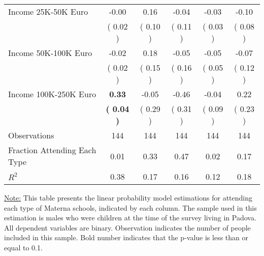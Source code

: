 \begin{table}[H]
{\begin{tabular}{lccccc}
\quad Income 25K-50K Euro &     -0.00 &      0.16 &     -0.04 &     -0.03 &     -0.10 \\
\quad  & (     0.02 ) & (     0.10 )  & (     0.11 )  & (     0.03 ) & (     0.08 ) \\
\quad Income 50K-100K Euro &     -0.02 &      0.18 &     -0.05 &     -0.05 &     -0.07 \\
\quad  & (     0.02 ) & (     0.15 )  & (     0.16 )  & (     0.05 ) & (     0.12 ) \\
\quad Income 100K-250K Euro & \textbf{     0.33} &     -0.05 &     -0.46 &     -0.04 &      0.22 \\
\quad  & \textbf{(     0.04 )} & (     0.29 )  & (     0.31 )  & (     0.09 ) & (     0.23 ) \\
\midrule
Observations & 144 & 144 & 144 & 144 & 144 \\
Fraction Attending Each Type &      0.01 &      0.33 &      0.47 &      0.02 &      0.17 \\
\midrule
$ R^2$ &      0.38 &      0.17 &      0.16 &      0.12 &      0.18 \\
\bottomrule
\end{tabular}}
\end{table}
\begin{footnotesize}
\noindent\underline{Note:} This table presents the linear probability model estimations for attending each type of Materna schools, indicated by each column. The sample used in this estimation is males who were children at the time of the survey living in Padova. All dependent variables are binary. Observation indicates the number of people included in this sample. Bold number indicates that the p-value is less than or equal to 0.1.
\end{footnotesize}
